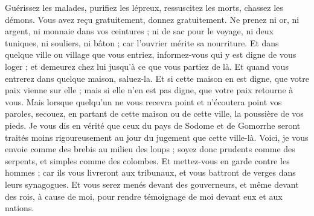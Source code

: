 \begin{multicols}{2}
Guérissez les malades, purifiez les lépreux, ressuscitez les morts, chassez les démons. Vous avez reçu gratuitement, donnez gratuitement{}.
Ne prenez ni or, ni argent, ni monnaie dans vos ceintures ;
ni de sac pour le voyage, ni deux tuniques, ni souliers, ni bâton ; car l'ouvrier mérite sa nourriture.
Et dans quelque ville ou village que vous entriez, informez-vous qui y est digne de vous loger ; et demeurez chez lui jusqu'à ce que vous partiez de là.
Et quand vous entrerez dans quelque maison, saluez-la.
Et si cette maison en est digne, que votre paix vienne sur elle ; mais si elle n'en est pas digne, que votre paix retourne à vous.
Mais lorsque quelqu'un ne vous recevra point et n'écoutera point vos paroles, secouez, en partant de cette maison ou de cette ville, la poussière de vos pieds.
Je vous dis en vérité que ceux du pays de Sodome et de Gomorrhe seront traités moins rigoureusement au jour du jugement que cette ville-là.
Voici, je vous envoie comme des brebis au milieu des loups ; soyez donc prudents comme des serpents, et simples comme des colombes.
Et mettez-vous en garde contre les hommes ; car ils vous livreront aux tribunaux, et vous battront de verges dans leurs synagogues.
Et vous serez menés devant des gouverneurs, et même devant des rois, à cause de moi, pour rendre témoignage de moi devant eux et aux nations.

\end{multicols}
